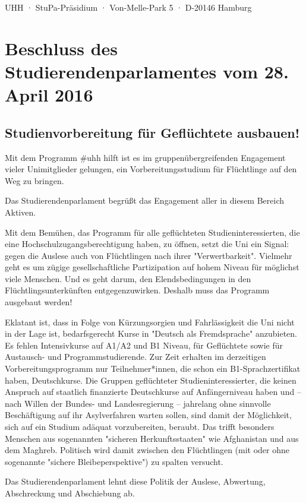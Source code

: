 \documentclass[ngerman,headheight=70pt]{scrartcl}
\begin{document}
    UHH · StuPa-Präsidium · Von-Melle-Park 5 · D-20146 Hamburg

    \section*{Beschluss des Studierendenparlamentes vom 28. April 2016}
    \subsection*{Studienvorbereitung für Geflüchtete ausbauen!}

    Mit dem Programm \#uhh hilft ist es im gruppenübergreifenden Engagement vieler
    Unimitglieder gelungen, ein Vorbereitungsstudium für Flüchtlinge auf den Weg
    zu bringen.

    Das Studierendenparlament begrüßt das Engagement aller in diesem Bereich Aktiven.

    Mit dem Bemühen, das Programm für alle geflüchteten Studieninteressierten,
    die eine Hochschulzugangsberechtigung haben, zu öffnen, setzt die Uni ein
    Signal: gegen die Auslese auch von Flüchtlingen nach ihrer "Verwertbarkeit".
    Vielmehr geht es um zügige gesellschaftliche Partizipation auf hohem Niveau
    für möglichst viele Menschen. Und es geht darum, den Elendsbedingungen in den
    Flüchtlingsunterkünften entgegenzuwirken. Deshalb muss das Programm ausgebaut
    werden!

    Eklatant ist, dass in Folge von Kürzungsorgien und Fahrlässigkeit die Uni
    nicht in der Lage ist, bedarfsgerecht Kurse in "Deutsch als Fremdsprache"
    anzubieten. Es fehlen Intensivkurse auf A1/A2 und B1 Niveau, für Geflüchtete
    sowie für Austausch- und Programmstudierende. Zur Zeit erhalten im derzeitigen
    Vorbereitungsprogramm nur Teilnehmer*innen, die schon ein B1-Sprachzertifikat
    haben, Deutschkurse. Die Gruppen geflüchteter Studieninteressierter, die keinen
    Anspruch auf staatlich finanzierte Deutschkurse auf Anfängerniveau haben und
    -- nach Willen der Bundes- und Landesregierung -- jahrelang ohne sinnvolle
    Beschäftigung auf ihr Asylverfahren warten sollen, sind damit der Möglichkeit,
    sich auf ein Studium adäquat vorzubereiten, beraubt. Das trifft besonders
    Menschen aus sogenannten "sicheren Herkunftsstaaten" wie Afghanistan und aus
    dem Maghreb. Politisch wird damit zwischen den Flüchtlingen (mit oder ohne
    sogenannte "sichere Bleibeperspektive") zu spalten versucht.


    Das Studierendenparlament lehnt diese Politik der Auslese, Abwertung,
    Abschreckung und Abschiebung ab.
\end{document}
